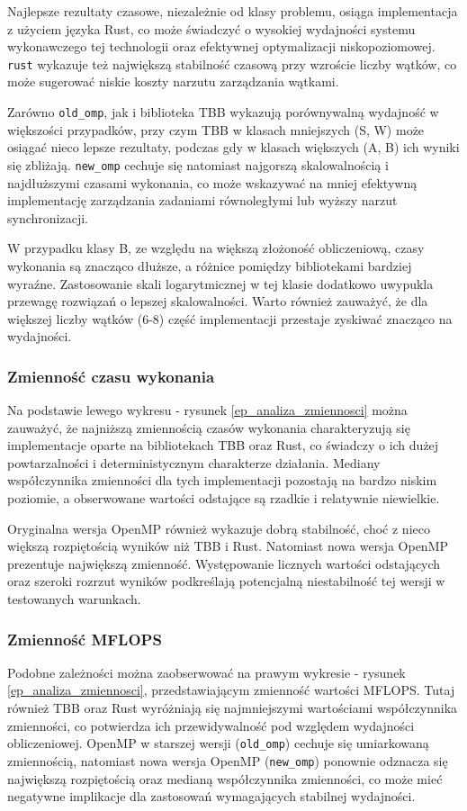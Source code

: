 Najlepsze rezultaty czasowe, niezależnie od klasy problemu, osiąga implementacja z użyciem języka Rust, co może świadczyć o wysokiej wydajności systemu wykonawczego tej technologii oraz efektywnej optymalizacji niskopoziomowej. \texttt{rust} wykazuje też największą stabilność czasową przy wzroście liczby wątków, co może sugerować niskie koszty narzutu zarządzania wątkami.

Zarówno \texttt{old\_omp}, jak i biblioteka TBB wykazują porównywalną wydajność w większości przypadków, przy czym TBB w klasach mniejszych (S, W) może osiągać nieco lepsze rezultaty, podczas gdy w klasach większych (A, B) ich wyniki się zbliżają. \texttt{new\_omp} cechuje się natomiast najgorszą skalowalnością i najdłuższymi czasami wykonania, co może wskazywać na mniej efektywną implementację zarządzania zadaniami równoległymi lub wyższy narzut synchronizacji.

W przypadku klasy B, ze względu na większą złożoność obliczeniową, czasy wykonania są znacząco dłuższe, a różnice pomiędzy bibliotekami bardziej wyraźne. Zastosowanie skali logarytmicznej w tej klasie dodatkowo uwypukla przewagę rozwiązań o lepszej skalowalności. Warto również zauważyć, że dla większej liczby wątków (6-8) część implementacji przestaje zyskiwać znacząco na wydajności.

\subsubsection{Zmienność czasu wykonania}
Na podstawie lewego wykresu - rysunek \ref{ep_analiza_zmiennosci} można zauważyć, że najniższą zmiennością czasów wykonania charakteryzują się implementacje oparte na bibliotekach TBB oraz Rust, co świadczy o ich dużej powtarzalności i deterministycznym charakterze działania. Mediany współczynnika zmienności dla tych implementacji pozostają na bardzo niskim poziomie, a obserwowane wartości odstające są rzadkie i relatywnie niewielkie.

Oryginalna wersja OpenMP również wykazuje dobrą stabilność, choć z nieco większą rozpiętością wyników niż TBB i Rust. Natomiast nowa wersja OpenMP prezentuje największą zmienność. Występowanie licznych wartości odstających oraz szeroki rozrzut wyników podkreślają potencjalną niestabilność tej wersji w testowanych warunkach.

\subsubsection{Zmienność MFLOPS}
Podobne zależności można zaobserwować na prawym wykresie - rysunek \ref{ep_analiza_zmiennosci}, przedstawiającym zmienność wartości MFLOPS. Tutaj również TBB oraz Rust wyróżniają się najmniejszymi wartościami współczynnika zmienności, co potwierdza ich przewidywalność pod względem wydajności obliczeniowej. OpenMP w starszej wersji (\texttt{old\_omp}) cechuje się umiarkowaną zmiennością, natomiast nowa wersja OpenMP (\texttt{new\_omp}) ponownie odznacza się największą rozpiętością oraz medianą współczynnika zmienności, co może mieć negatywne implikacje dla zastosowań wymagających stabilnej wydajności.



